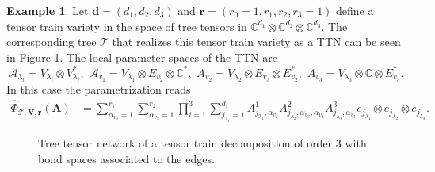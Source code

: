 \documentclass[12pt]{article}
\theoremstyle{definition}
\newtheorem{example}[theorem]{Example}
\numberwithin{theorem}{section}
\newcommand{\CC}{\mathbb{C}}
\begin{document}
\begin{example}
Let $\mathbf{d} = (d_1, d_2,d_3)$ and 
$\mathbf{r} = (r_0=1, r_1, r_2, r_3=1)$
define a tensor train variety in the space of tree tensors in $\CC^{d_1} \otimes \CC^{d_2} \otimes \CC^{d_3}$. 
The corresponding tree $\mathscr{T}$
that realizes this tensor train variety as a TTN can be seen in Figure \ref{fig:TTN=TT_tree}. The local parameter spaces of the TTN are
\begin{equation*}
    \mathcal A_{\lambda_i} = V_{\lambda_i}\otimes V_{\lambda_i}^*, \,\, \mathcal A_{v_1} = V_{\lambda_1}\otimes E_{v_2} \otimes \CC^*, \,\, A_{v_2} = V_{\lambda_2}\otimes E_{v_3} \otimes E_{v_2}^* , \,\, 
    A_{v_3} = V_{\lambda_3}\otimes \CC \otimes E_{v_3}^*.
\end{equation*}
In this case the parametrization reads
\begin{align*}
\widehat{\Phi}_{\mathscr{T}, \mathbf{V}, \mathbf{r}}(\mathbf{A})     &= \sum_{\alpha_{v_2}=1}^{r_{1}}\sum_{\alpha_{v_3}=1}^{r_{2}}\prod_{i = 1}^{3}\sum_{j_{\lambda_i}=1}^{d_i} A^1_{j_{\lambda_1}, \alpha_{v_2}} A^2_{j_{\lambda_2}, \alpha_{v_3}, \alpha_{v_2}}A^3_{j_{\lambda_3}, \alpha_{v_3}} e_{j_{\lambda_1}}\otimes e_{j_{\lambda_2}} \otimes e_{j_{\lambda_3}}. 
\end{align*}
\end{example}
\begin{figure}[h!]
    \centering
    \caption{Tree tensor network of a tensor train decomposition of order 3 with bond spaces associated to the edges.}
    \label{fig:TTN=TT_tree}
\end{figure}
\end{document}
